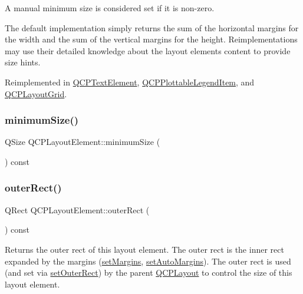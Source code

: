 A manual minimum size is considered set if it is non-\/zero.

The default implementation simply returns the sum of the horizontal margins for the width and the sum of the vertical margins for the height. Reimplementations may use their detailed knowledge about the layout element\textquotesingle{}s content to provide size hints. 

Reimplemented in \mbox{\hyperlink{class_q_c_p_text_element_a47b8541f55ff520c557e0f27461f109e}{Q\+C\+P\+Text\+Element}}, \mbox{\hyperlink{class_q_c_p_plottable_legend_item_a8b543f3ac32b2fe59326e01c1101b3b8}{Q\+C\+P\+Plottable\+Legend\+Item}}, and \mbox{\hyperlink{class_q_c_p_layout_grid_a0438bc58b4d3894d01db95b08d4268df}{Q\+C\+P\+Layout\+Grid}}.

\mbox{\label{class_q_c_p_layout_element_a60d4295468a2b57fe91f6f68e20c3993}} 
\subsubsection{\texorpdfstring{minimumSize()}{minimumSize()}}
{\footnotesize\ttfamily Q\+Size Q\+C\+P\+Layout\+Element\+::minimum\+Size (\begin{DoxyParamCaption}{ }\end{DoxyParamCaption}) const\hspace{0.3cm}{\ttfamily [inline]}}

\mbox{\label{class_q_c_p_layout_element_a2a32a12a6161c9dffbadeb9cc585510c}} 
\subsubsection{\texorpdfstring{outerRect()}{outerRect()}}
{\footnotesize\ttfamily Q\+Rect Q\+C\+P\+Layout\+Element\+::outer\+Rect (\begin{DoxyParamCaption}{ }\end{DoxyParamCaption}) const\hspace{0.3cm}{\ttfamily [inline]}}

Returns the outer rect of this layout element. The outer rect is the inner rect expanded by the margins (\mbox{\hyperlink{class_q_c_p_layout_element_a8f450b1f3f992ad576fce2c63d8b79cf}{set\+Margins}}, \mbox{\hyperlink{class_q_c_p_layout_element_accfda49994e3e6d51ed14504abf9d27d}{set\+Auto\+Margins}}). The outer rect is used (and set via \mbox{\hyperlink{class_q_c_p_layout_element_a38975ea13e36de8e53391ce41d94bc0f}{set\+Outer\+Rect}}) by the parent \mbox{\hyperlink{class_q_c_p_layout}{Q\+C\+P\+Layout}} to control the size of this layout element.

